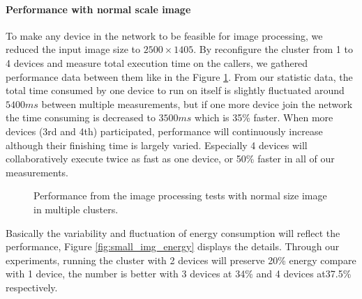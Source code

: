 \documentclass[conference]{IEEEtran}
\begin{document}
\paragraph{Performance with normal scale image}
To make any device in the network to be feasible for image processing, we reduced the input image size to $2500 \times 1405$. By reconfigure the cluster from 1 to 4 devices and measure total execution time on the callers, we gathered performance data between them like in the Figure \ref{fig:small_img_perf}. From our statistic data, the total time consumed by one device to run on itself is slightly fluctuated around $5400ms$ between multiple measurements, but if one more device join the network the time consuming is decreased to $3500ms$ which is 35\% faster. When more devices (3rd and 4th) participated, performance will continuously increase although their finishing time is largely varied. Especially 4 devices will collaboratively execute twice as fast as one device, or 50\% faster in all of our measurements.

\begin{figure}[H]
	\hspace*{0cm}
	\caption{Performance from the image processing tests with normal size image in multiple clusters.}
	\label{fig:small_img_perf}
\end{figure}

Basically the variability and fluctuation of energy consumption will reflect the performance, Figure \ref{fig:small_img_energy} displays the details. Through our experiments, running the cluster with 2 devices will preserve 20\% energy compare with 1 device, the number is better with 3 devices at 34\% and 4 devices at37.5\% respectively.
\end{document}
